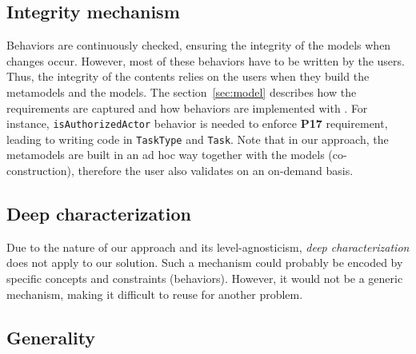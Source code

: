 

  \subsection{Integrity mechanism}


  Behaviors are continuously checked, ensuring the integrity of the models when
  changes occur. However, most of these behaviors have to be written by the
  users. Thus, the integrity of the contents relies on the users when they
  build the metamodels and the models. The section~\ref{sec:model} describes
  how the requirements are captured and how behaviors are implemented with
  \FML. For instance, \texttt{isAuthorizedActor} behavior is needed to enforce
  \textbf{P17} requirement, leading to writing \FML code in \texttt{TaskType}
  and \texttt{Task}. Note that in our approach, the metamodels are built in an
  {\color{red}ad hoc} way together with the models (co-construction), therefore the user
  also validates on an on-demand basis.

  \subsection{Deep characterization}



  Due to the nature of our approach and its level-agnosticism, \emph{deep
  characterization} does not apply to our solution. Such a mechanism could
  probably be encoded by specific concepts and constraints (behaviors).
  However, it would not be a generic mechanism, making it difficult to reuse
  for another problem.

  \subsection{Generality}


